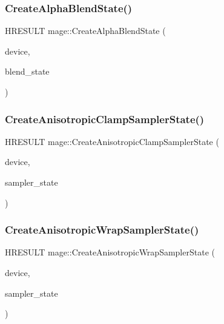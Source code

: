 \hypertarget{namespacemage_a334c4403848e086f84b328883ff387cc}{}\label{namespacemage_a334c4403848e086f84b328883ff387cc} 
\subsubsection{\texorpdfstring{Create\+Alpha\+Blend\+State()}{CreateAlphaBlendState()}}
{\footnotesize\ttfamily H\+R\+E\+S\+U\+LT mage\+::\+Create\+Alpha\+Blend\+State (\begin{DoxyParamCaption}\item[{I\+D3\+D11\+Device2 $\ast$}]{device,  }\item[{I\+D3\+D11\+Blend\+State $\ast$$\ast$}]{blend\+\_\+state }\end{DoxyParamCaption})}

\hypertarget{namespacemage_af85f5fe2b35fb8992c3eea69e87ad039}{}\label{namespacemage_af85f5fe2b35fb8992c3eea69e87ad039} 
\subsubsection{\texorpdfstring{Create\+Anisotropic\+Clamp\+Sampler\+State()}{CreateAnisotropicClampSamplerState()}}
{\footnotesize\ttfamily H\+R\+E\+S\+U\+LT mage\+::\+Create\+Anisotropic\+Clamp\+Sampler\+State (\begin{DoxyParamCaption}\item[{I\+D3\+D11\+Device2 $\ast$}]{device,  }\item[{I\+D3\+D11\+Sampler\+State $\ast$$\ast$}]{sampler\+\_\+state }\end{DoxyParamCaption})}

\hypertarget{namespacemage_a38bc123db04b8434276d3a350b5acc7f}{}\label{namespacemage_a38bc123db04b8434276d3a350b5acc7f} 
\subsubsection{\texorpdfstring{Create\+Anisotropic\+Wrap\+Sampler\+State()}{CreateAnisotropicWrapSamplerState()}}
{\footnotesize\ttfamily H\+R\+E\+S\+U\+LT mage\+::\+Create\+Anisotropic\+Wrap\+Sampler\+State (\begin{DoxyParamCaption}\item[{I\+D3\+D11\+Device2 $\ast$}]{device,  }\item[{I\+D3\+D11\+Sampler\+State $\ast$$\ast$}]{sampler\+\_\+state }\end{DoxyParamCaption})}

